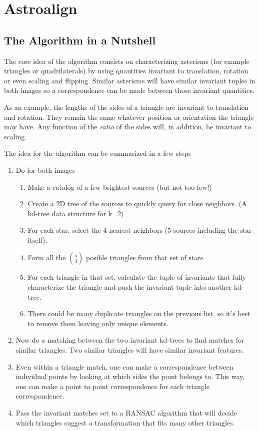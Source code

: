 \chapter{Astroalign}

\section*{The Algorithm in a Nutshell}

The core idea of the algorithm consists on characterizing asterisms (for example triangles or quadrilaterals) by using quantities invariant to translation, rotation or even scaling and flipping. Similar asterisms will have similar invariant tuples in both images so a correspondence can be made between those invariant quantities. 

As an example, the lengths of the sides of a triangle are invariant to translation and rotation. They remain the same whatever position or orientation the triangle may have. Any function of the {\em ratio} of the sides will, in addition, be invariant to scaling.

The idea for the algorithm can be summarized in a few steps

\begin{enumerate}
\item Do for both images \begin{enumerate}
\item Make a catalog of a few brightest sources (but not too few!)
\item Create a 2D tree of the sources to quickly query for close neighbors. (A kd-tree data structure for k=2)
\item For each star, select the 4 nearest neighbors (5 sources including the star itself).
\item Form all the ${5}\choose{3}$ posible triangles from that set of stars.
\item For each triangle in that set, calculate the tuple of invariants that fully characterize the triangle and push the invariant tuple into another kd-tree.
\item There could be many duplicate triangles on the previous list, so it's best to remove them leaving only unique elements.
\end{enumerate}
\item Now do a matching between the two invariant kd-trees to find matches for similar triangles. Two similar triangles will have similar invariant features.
\item Even within a triangle match, one can make a correspondence between individual points by looking at which sides the point belongs to. This way, one can make a point to point correspondence for each triangle correspondence.
\item Pass the invariant matches set to a RANSAC algorithm that will decide which triangles suggest a transformation that fits many other triangles.
\end{enumerate}


